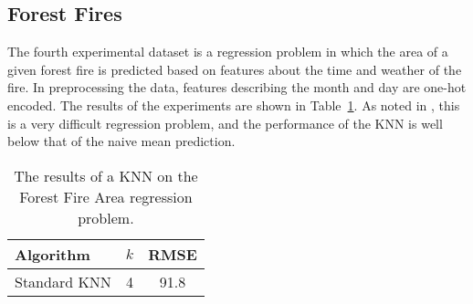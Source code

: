 \documentclass{amsart}
\begin{document}
    \subsection*{Forest Fires}
    The fourth experimental dataset is a regression problem in which the area of a given
    forest fire is predicted based on features about the time and weather of the fire\cite{ff_dataset}.
    In preprocessing the data, features describing the month and day are one-hot encoded.
    The results of the experiments are shown in Table~\ref{fire_forest_area}.
    As noted in \cite{ff_dataset}, this is a very difficult regression problem, and the performance
    of the KNN is well below that of the naive mean prediction.
    \begin{table}[H]
    \begin{tabular}{lcc}
        Algorithm     & $k$ & RMSE \\
        \hline
        Standard KNN  & 4 & 91.8
    \end{tabular}
    \label{fire_forest_area}
    \caption{The results of a KNN on the Forest Fire Area regression problem.}
    \end{table}




\end{document}
